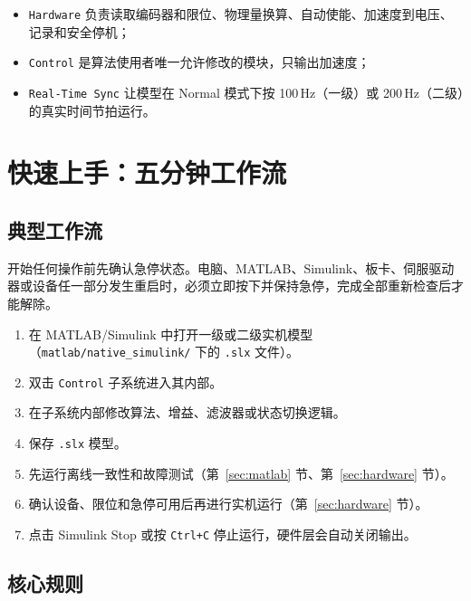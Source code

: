 \documentclass[12pt,a4paper]{article}
\begin{document}
\begin{itemize}
    \item \texttt{Hardware} 负责读取编码器和限位、物理量换算、自动使能、加速度到电压、记录和安全停机；
    \item \texttt{Control} 是算法使用者唯一允许修改的模块，只输出加速度；
    \item \texttt{Real-Time Sync} 让模型在 Normal 模式下按 100\,Hz（一级）或 200\,Hz（二级）的真实时间节拍运行。
\end{itemize}

\section{快速上手：五分钟工作流}
\label{sec:quickstart}

\subsection{典型工作流}

\begin{dangerbox}
    开始任何操作前先确认急停状态。电脑、MATLAB、Simulink、板卡、伺服驱动器或设备任一部分发生重启时，必须立即按下并保持急停，完成全部重新检查后才能解除。
\end{dangerbox}

\begin{enumerate}
    \item 在 MATLAB/Simulink 中打开一级或二级实机模型（\texttt{matlab/native\_simulink/} 下的 \texttt{.slx} 文件）。
    \item 双击 \texttt{Control} 子系统进入其内部。
    \item 在子系统内部修改算法、增益、滤波器或状态切换逻辑。
    \item 保存 \texttt{.slx} 模型。
    \item 先运行离线一致性和故障测试（第~\ref{sec:matlab} 节、第~\ref{sec:hardware} 节）。
    \item 确认设备、限位和急停可用后再进行实机运行（第~\ref{sec:hardware} 节）。
    \item 点击 Simulink Stop 或按 \texttt{Ctrl+C} 停止运行，硬件层会自动关闭输出。
\end{enumerate}

\subsection{核心规则}
\end{document}
